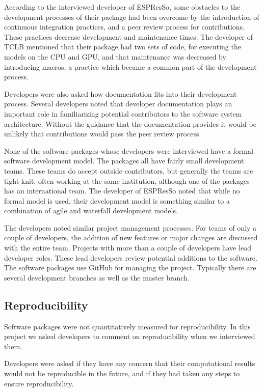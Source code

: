 \documentclass[12pt, notitlepage]{article}
\begin{document}
According to the interviewed developer of ESPResSo, some obstacles to the development processes of their package had been overcome by the introduction of continuous integration practices, and a peer review process for contributions. These practices decrease development and maintenance times. The developer of TCLB mentioned that their package had two sets of code, for executing the models on the CPU and GPU, and that maintenance was decreased by introducing macros, a practice which became a common part of the development process. 

Developers were also asked how documentation fits into their development process. Several developers noted that developer documentation plays an important role in familiarizing potential contributors to the software system architecture. Without the guidance that the documentation provides it would be unlikely that contributions would pass the peer review process. 

None of the software packages whose developers were interviewed have a formal software development model. The packages all have fairly small development teams. These teams do accept outside contributors, but generally the teams are tight-knit, often working at the same institution, although one of the packages has an international team. The developer of ESPResSo noted that while no formal model is used, their development model is something similar to a combination of agile and waterfall development models. 

The developers noted similar project management processes. For teams of only a couple of developers, the addition of new features or major changes are discussed with the entire team. Projects with more than a couple of developers have lead developer roles. These lead developers review potential additions to the software. The software packages use GitHub for managing the project. Typically there are several development branches as well as the master branch.

\subsection{Reproducibility}

Software packages were not quantitatively measured for reproducibility.
In this project we asked developers to comment on reproducibility when we interviewed them.

Developers were asked if they have any concern that their computational results would not be reproducible in the future, and if they had taken any steps to ensure reproducibility.
\end{document}
